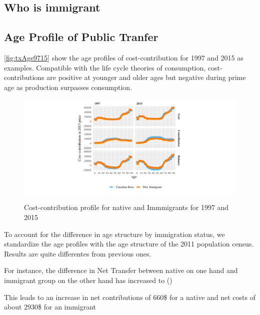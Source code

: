 \subsection{Who is immigrant}\label{sec:immig}

\subsection{Age Profile of Public Tranfer}\label{sec:profile}

\autoref{fig:txAge9715} show the age profiles of cost-contribution for 1997 and 2015 as examples. Compatible with the life cycle theories of consumption, cost-contributions are positive at younger and older ages but negative during prime age as production surpasses consumption.

\begin{figure}[H]%
  \caption{ Cost-contribution profile for native and Immmigrants for 1997 and 2015}
  \includegraphics[width=1\textwidth]{./res/txAge9715.pdf}%
  \label{fig:txAge9715}%
\end{figure}%




To account for the difference in age structure by immigration status, we standardize the age profiles with the age structure of the 2011 population census. Results are quite differentes from previous ones.

For instance, the difference in Net Transfer between native on one hand and  immigrant group on the other hand has increased to ()



This leads to an increase in net contributions of 660\$ for a native and net costs of about 2930\$ for an immigrant

